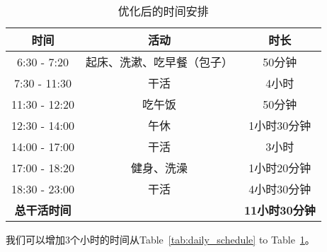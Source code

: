\documentclass{article}
\begin{document}
\begin{table}[h]
    \centering
    \caption{优化后的时间安排}
    \label{tab:optimized_schedule}
    \begin{tabular}{|c|c|c|}
        \hline
        时间 & 活动 & 时长 \\ \hline
        6:30 - 7:20 & 起床、洗漱、吃早餐（包子） & 50分钟 \\ \hline
        7:30 - 11:30 & 干活 & 4小时 \\ \hline
        11:30 - 12:20 & 吃午饭 & 50分钟 \\ \hline
        12:30 - 14:00 & 午休 & 1小时30分钟 \\ \hline
        14:00 - 17:00 & 干活 & 3小时 \\ \hline
        17:00 - 18:20 & 健身、洗澡 & 1小时20分钟 \\ \hline
        18:30 - 23:00 & 干活 & 4小时30分钟 \\ \hline
        \hline
        \textbf{总干活时间} & & \textbf{11小时30分钟} \\ \hline
    \end{tabular}
  
\end{table}

我们可以增加3个小时的时间从Table~\ref{tab:daily_schedule} to Table~\ref{tab:optimized_schedule}。
\end{document}
